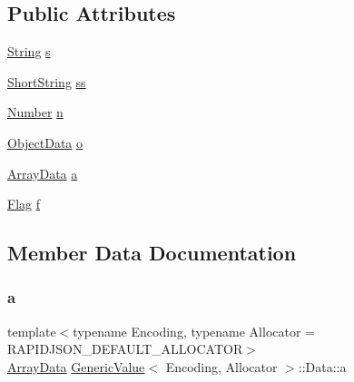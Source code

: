 \subsection*{Public Attributes}
\begin{DoxyCompactItemize}
\item 
\hyperlink{structGenericValue_1_1String}{String} \hyperlink{unionGenericValue_1_1Data_a6872a4b93763944063b425e6c001ed2b}{s}
\item 
\hyperlink{structGenericValue_1_1ShortString}{Short\+String} \hyperlink{unionGenericValue_1_1Data_a410e39a5dc296eb3b152b54193740e4c}{ss}
\item 
\hyperlink{unionGenericValue_1_1Number}{Number} \hyperlink{unionGenericValue_1_1Data_a243007cce2f4b75bea3e3c1ee4c3c239}{n}
\item 
\hyperlink{structGenericValue_1_1ObjectData}{Object\+Data} \hyperlink{unionGenericValue_1_1Data_af6417eca530fba0d8bd65d309628eb11}{o}
\item 
\hyperlink{structGenericValue_1_1ArrayData}{Array\+Data} \hyperlink{unionGenericValue_1_1Data_aeac31cf55bf5a024cead5ecb63e4fd48}{a}
\item 
\hyperlink{structGenericValue_1_1Flag}{Flag} \hyperlink{unionGenericValue_1_1Data_ad8572112da083c775ce21bcbca96b2ab}{f}
\end{DoxyCompactItemize}


\subsection{Member Data Documentation}
\mbox{\label{unionGenericValue_1_1Data_aeac31cf55bf5a024cead5ecb63e4fd48}} 
\subsubsection{\texorpdfstring{a}{a}}
{\footnotesize\ttfamily template$<$typename Encoding, typename Allocator = R\+A\+P\+I\+D\+J\+S\+O\+N\+\_\+\+D\+E\+F\+A\+U\+L\+T\+\_\+\+A\+L\+L\+O\+C\+A\+T\+OR$>$ \\
\hyperlink{structGenericValue_1_1ArrayData}{Array\+Data} \hyperlink{classGenericValue}{Generic\+Value}$<$ Encoding, Allocator $>$\+::Data\+::a}

\mbox{\label{unionGenericValue_1_1Data_ad8572112da083c775ce21bcbca96b2ab}} 
